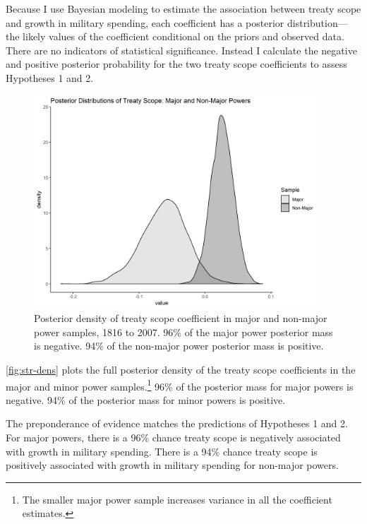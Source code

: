 \documentclass[12pt]{article}
\begin{document}
Because I use Bayesian modeling to estimate the association between treaty scope and growth in military spending, each coefficient has a posterior distribution--- the likely values of the coefficient conditional on the priors and observed data.
There are no indicators of statistical significance. 
Instead I calculate the negative and positive posterior probability for the two treaty scope coefficients to assess Hypotheses 1 and 2.


\begin{figure}[htbp]
	\centering
		\includegraphics[width=0.95\textwidth]{../figures/scope-dens-split.png}
	\caption{Posterior density of treaty scope coefficient in major and non-major power samples, 1816 to 2007. 96\% of the major power posterior mass is negative. 94\% of the non-major power posterior mass is positive.}
	\label{fig:str-dens}
\end{figure}


\autoref{fig:str-dens} plots the full posterior density of the treaty scope coefficients in the major and minor power samples.\footnote{The smaller major power sample increases variance in all the coefficient estimates.} 
96\% of the posterior mass for major powers is negative. 
94\% of the posterior mass for minor powers is positive. 


The preponderance of evidence matches the predictions of Hypotheses 1 and 2. 
For major powers, there is a 96\% chance treaty scope is negatively associated with growth in military spending. 
There is a 94\% chance treaty scope is positively associated with growth in military spending for non-major powers.
\end{document}
